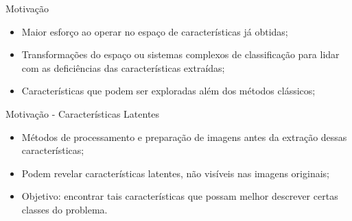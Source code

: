 \documentclass{beamer}
\begin{document}
\begin{frame}{Motivação}
\setlength\leftmargini{0em}
\justifying
\begin{itemize}
\item Maior esforço ao operar no espaço de características já obtidas;
\item Transformações do espaço ou sistemas complexos de classificação para lidar com as deficiências das características extraídas;
\item Características que podem ser exploradas além dos métodos clássicos;
\end{itemize}
\end{frame}
\begin{frame}{Motivação - Características Latentes}
\setlength\leftmargini{0em}
\justifying
{}
\begin{itemize}
\item Métodos de processamento e preparação de imagens antes da extração dessas características;
\item Podem revelar características latentes, não visíveis nas imagens originais;
\item Objetivo: encontrar tais características que possam melhor descrever certas classes do problema.
\end{itemize}
\end{frame}
\end{document}
